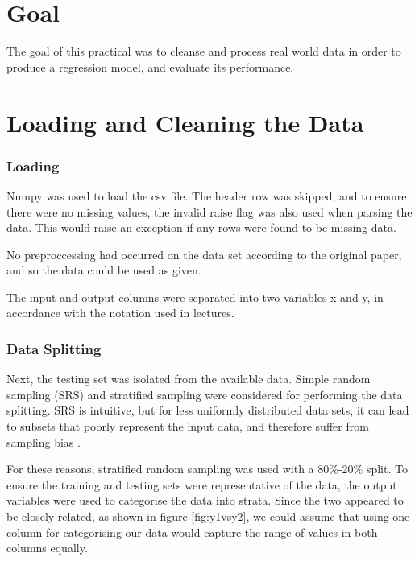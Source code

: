 \documentclass[12pt]{article}
\begin{document}

\part*{Goal}

The goal of this practical was to cleanse and process real world data in order to produce a regression model, and evaluate its performance.

\tableofcontents

\pagebreak

\setcounter{page}{1}

\part{Loading and Cleaning the Data}

\section{Loading}
Numpy was used to load the csv file. The header row was skipped, and to ensure there were no missing values, the invalid raise flag was also used when parsing the data. This would raise an exception if any rows were found to be missing data. 

No preproccessing had occurred on the data set according to the original paper, and so the data could be used as given.

The input and output columns were separated into two variables x and y, in accordance with the notation used in lectures.

\section{Data Splitting}

Next, the testing set was isolated from the available data. Simple random sampling (SRS) and stratified sampling were considered for performing the data splitting. SRS is intuitive, but for less uniformly distributed data sets, it can lead to subsets that poorly represent the input data, and therefore suffer from sampling bias \cite{reitermanova_2010}. 

For these reasons, stratified random sampling was used with a 80\%-20\% split.  To ensure the training and testing sets were representative of the data, the output variables were used to categorise the data into strata. Since the two appeared to be closely related, as shown in figure \ref{fig:y1vsy2}, we could assume that using one column for categorising our data would capture the range of values in both columns equally.
\end{document}
